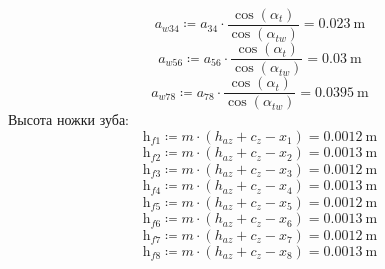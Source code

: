 \documentclass{article}
\newcommand{\defeq}{\coloneq} %
\begin{document}
\begin{equation*}
\textit{a}_{\textit{w34}} \defeq \textit{a}_{\textit{34}} \cdot \frac{\cos \left( α_{t} \right)}{\cos \left( α_{tw} \right)} = {0.023 \: \mathrm{m}}
\end{equation*}
\begin{equation*}
\textit{a}_{\textit{w56}} \defeq \textit{a}_{\textit{56}} \cdot \frac{\cos \left( α_{t} \right)}{\cos \left( α_{tw} \right)} = {0.03 \: \mathrm{m}}
\end{equation*}
\begin{equation*}
\textit{a}_{\textit{w78}} \defeq \textit{a}_{\textit{78}} \cdot \frac{\cos \left( α_{t} \right)}{\cos \left( α_{tw} \right)} = {0.0395 \: \mathrm{m}}
\end{equation*}
\colorbox[HTML]{000000}{Высота ножки зуба:}\newline
\begin{equation*}
\textit{h}_{\textit{f1}} \defeq m \cdot \left( h_{az}+c_{z}-\textit{x}_{\textit{1}} \right) = {0.0012 \: \mathrm{m}}
\end{equation*}
\begin{equation*}
\textit{h}_{\textit{f2}} \defeq m \cdot \left( h_{az}+c_{z}-\textit{x}_{\textit{2}} \right) = {0.0013 \: \mathrm{m}}
\end{equation*}
\begin{equation*}
\textit{h}_{\textit{f3}} \defeq m \cdot \left( h_{az}+c_{z}-\textit{x}_{\textit{3}} \right) = {0.0012 \: \mathrm{m}}
\end{equation*}
\begin{equation*}
\textit{h}_{\textit{f4}} \defeq m \cdot \left( h_{az}+c_{z}-\textit{x}_{\textit{4}} \right) = {0.0013 \: \mathrm{m}}
\end{equation*}
\begin{equation*}
\textit{h}_{\textit{f5}} \defeq m \cdot \left( h_{az}+c_{z}-\textit{x}_{\textit{5}} \right) = {0.0012 \: \mathrm{m}}
\end{equation*}
\begin{equation*}
\textit{h}_{\textit{f6}} \defeq m \cdot \left( h_{az}+c_{z}-\textit{x}_{\textit{6}} \right) = {0.0013 \: \mathrm{m}}
\end{equation*}
\begin{equation*}
\textit{h}_{\textit{f7}} \defeq m \cdot \left( h_{az}+c_{z}-\textit{x}_{\textit{7}} \right) = {0.0012 \: \mathrm{m}}
\end{equation*}
\begin{equation*}
\textit{h}_{\textit{f8}} \defeq m \cdot \left( h_{az}+c_{z}-\textit{x}_{\textit{8}} \right) = {0.0013 \: \mathrm{m}}
\end{equation*}
\end{document}
